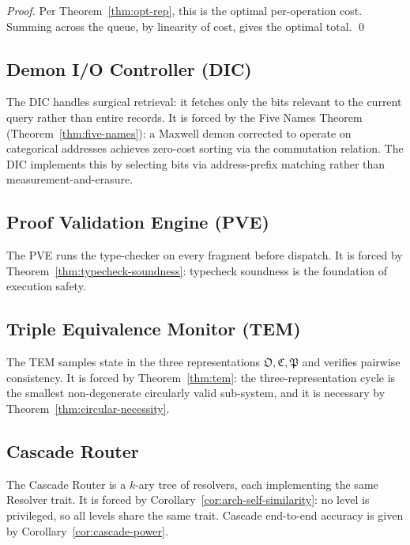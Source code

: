 \documentclass[twocolumn,a4paper]{article}
\newcommand{\OOsc}{\mathfrak{O}}
\newcommand{\CCat}{\mathfrak{C}}
\newcommand{\PPart}{\mathfrak{P}}
\begin{document}
\begin{proof}
Per Theorem~\ref{thm:opt-rep}, this is the optimal per-operation cost. Summing across the queue, by linearity of cost, gives the optimal total. \qed
\end{proof}

\subsection{Demon I/O Controller (DIC)}

The DIC handles surgical retrieval: it fetches only the bits relevant to the current query rather than entire records. It is forced by the Five Names Theorem (Theorem~\ref{thm:five-names}): a Maxwell demon corrected to operate on categorical addresses achieves zero-cost sorting via the commutation relation. The DIC implements this by selecting bits via address-prefix matching rather than measurement-and-erasure.

\subsection{Proof Validation Engine (PVE)}

The PVE runs the type-checker on every fragment before dispatch. It is forced by Theorem~\ref{thm:typecheck-soundness}: typecheck soundness is the foundation of execution safety.

\subsection{Triple Equivalence Monitor (TEM)}

The TEM samples state in the three representations $\OOsc,\CCat,\PPart$ and verifies pairwise consistency. It is forced by Theorem~\ref{thm:tem}: the three-representation cycle is the smallest non-degenerate circularly valid sub-system, and it is necessary by Theorem~\ref{thm:circular-necessity}.

\subsection{Cascade Router}

The Cascade Router is a $k$-ary tree of resolvers, each implementing the same Resolver trait. It is forced by Corollary~\ref{cor:arch-self-similarity}: no level is privileged, so all levels share the same trait. Cascade end-to-end accuracy is given by Corollary~\ref{cor:cascade-power}.
\end{document}
